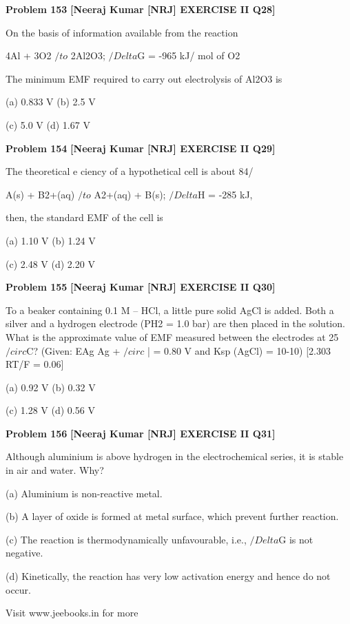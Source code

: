 \begin{problembox}
\textbf{Problem 153} \hfill \textbf{[Neeraj Kumar [NRJ] EXERCISE II Q28]}
\label{q:ext-nrj_all_questions-153}

On the basis of information available from the 
reaction
 
   4Al + 3O2 $/to$ 2Al2O3; $/Delta$G = -965  kJ/ mol of O2
 
 The minimum EMF required to carry out 
electrolysis of Al2O3 is
 
 (a) 0.833 V 
(b) 2.5 V
 
 (c) 5.0 V 
(d) 1.67 V
\end{problembox}

\begin{problembox}
\textbf{Problem 154} \hfill \textbf{[Neeraj Kumar [NRJ] EXERCISE II Q29]}
\label{q:ext-nrj_all_questions-154}

The theoretical e   ciency of a hypothetical cell is 
about 84/%
 
   A(s) + B2+(aq) $/to$ A2+(aq) + B(s); $/Delta$H = -285 kJ,
 
 then, the standard EMF of the cell is
 
 (a) 1.10 V 
(b) 1.24 V
 
 (c) 2.48 V 
(d) 2.20 V
\end{problembox}

\begin{problembox}
\textbf{Problem 155} \hfill \textbf{[Neeraj Kumar [NRJ] EXERCISE II Q30]}
\label{q:ext-nrj_all_questions-155}

To a beaker containing 0.1 M -- HCl, a little 
pure solid AgCl is added. Both a silver and a 
hydrogen electrode (PH2 = 1.0 bar) are then placed 
in the solution. What is the approximate value of 
EMF measured between the electrodes at 25$/circ$C? 
(Given: EAg
Ag
+
$/circ$
|
 = 0.80 V and Ksp (AgCl) = 10-10) 
[2.303 RT/F = 0.06]
 
 (a) 0.92 V 
(b) 0.32 V
 
 (c) 1.28 V 
(d) 0.56 V
\end{problembox}

\begin{problembox}
\textbf{Problem 156} \hfill \textbf{[Neeraj Kumar [NRJ] EXERCISE II Q31]}
\label{q:ext-nrj_all_questions-156}

Although aluminium is above hydrogen in the 
electrochemical series, it is stable in air and water. 
Why?
 
 (a) Aluminium is non-reactive metal.
 
 (b)  A layer of oxide is formed at metal surface, 
which prevent further reaction.
 
 (c)  The 
reaction 
is 
thermodynamically 
unfavourable, i.e., $/Delta$G is not negative.
 
 (d)  Kinetically, the reaction has very low 
activation energy and hence do not occur.
 
 
Visit www.jeebooks.in for more
\end{problembox}

